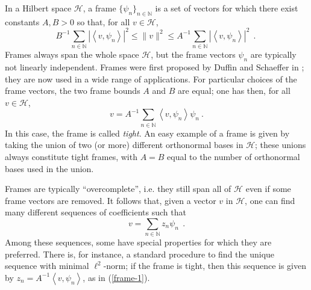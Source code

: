 \documentclass[10pt]{article}
\def\N{\mathbb{N}}
\def\cH{\mathcal{H}}
\newcommand\eref[1]{(\ref{#1})}
\begin{document}
In a Hilbert space $\cH$, a frame $\{\psi_n\}_{n \in \N}$ is a
set of vectors for which there exist
constants $A, B >0$ so that, for all $v \in \cH$,
$$
B^{-1} \sum_{n\in \N} |\left<v,\psi_n\right>|^2 \leq \|v\|^2 \leq
A^{-1} \sum_{n \in \N}
|\left< v, \psi_n\right>|^2  ~~.\
$$
Frames always span the whole space $\cH$, but the frame vectors $\psi_n$
are
typically not linearly independent. Frames were first proposed
by Duffin and Schaeffer in \cite{DuSh52}; they are now used in a wide
range of
applications.
For particular choices of the frame vectors, the two frame bounds $A$
and
$B$ are equal; one has then, for all $ v \in \cH$,
\begin{equation}
\label{frame-1}
v = A^{-1} \sum_{n \in \N} \left<v, \psi_n \right> \psi_n ~.
\end{equation}
In this case, the frame is called {\em tight}.
An easy example of a frame is given by taking the union of two (or more)
different
orthonormal bases in $\cH$; these unions always constitute tight frames,
with $A=B$ equal to the number of orthonormal bases used in the union.

Frames are typically ``overcomplete'', i.e. they still span all of
$\cH$ even if some frame vectors are removed. It follows that, given
a vector $v$ in $\cH$, one can find many different sequences of
coefficients
such that
\begin{equation}
\label{frame-v}
v = \sum_{n \in \N} z_n \psi_n ~~.
\end{equation}
Among these sequences, some have special properties for which they
are preferred. There is, for instance,
a standard procedure to find the unique sequence
with minimal $\ell^2$-norm; if the frame is tight, then this
sequence is given by $z_n=A^{-1} \left<v,\psi_n\right>$,
as in \eref{frame-1}.
\end{document}
